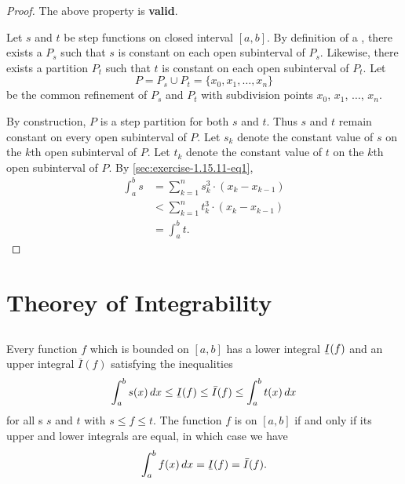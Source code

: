 \documentclass{report}
\begin{document}
\begin{proof}

  The above property is \textbf{valid}.

  \vspace{6pt}

  Let $s$ and $t$ be step functions on closed interval $[a, b]$.
  By definition of a , there exists a 
    $P_s$ such that $s$ is constant on each open subinterval of $P_s$.
  Likewise, there exists a partition $P_t$ such that $t$ is constant on each
    open subinterval of $P_t$.
  Let $$P = P_s \cup P_t = \{x_0, x_1, \ldots, x_n\}$$ be the common refinement
    of $P_s$ and $P_t$ with subdivision points $x_0$, $x_1$, $\ldots$, $x_n$.

  By construction, $P$ is a step partition for both $s$ and $t$.
  Thus $s$ and $t$ remain constant on every open subinterval of $P$.
  Let $s_k$ denote the constant value of $s$ on the $k$th open subinterval of
    $P$.
  Let $t_k$ denote the constant value of $t$ on the $k$th open subinterval of
    $P$.
  By \eqref{sec:exercise-1.15.11-eq1},
    \begin{align*}
      \int_a^b s
        & = \sum_{k=1}^n s_k^3 \cdot (x_k - x_{k-1}) \\
        & < \sum_{k=1}^n t_k^3 \cdot (x_k - x_{k-1}) \\
        & = \int_a^b t.
    \end{align*}

\end{proof}

\chapter{Theorey of Integrability}%
\label{chap:theory-integrability}

\section{}%
\label{sec:theorem-1.9}

\begin{theorem}[1.9]

  Every function $f$ which is bounded on $[a, b]$ has a lower integral
    $\ubar{I}(f)$ and an upper integral $\overline{I}(f)$ satisfying the
    inequalities
    \begin{equation}
      \label{sec:theorem-1.9-eq1}
      \int_a^b s(x) \mathop{dx} \leq \ubar{I}(f) \leq
        \bar{I}(f) \leq \int_a^b t(x) \mathop{dx}
    \end{equation}
    for all s $s$ and $t$ with $s \leq f \leq t$.
  The function $f$ is  on $[a, b]$ if and only if
    its upper and lower integrals are equal, in which case we have
    $$\int_a^b f(x) \mathop{dx} = \ubar{I}(f) = \bar{I}(f).$$

\end{theorem}
\end{document}
